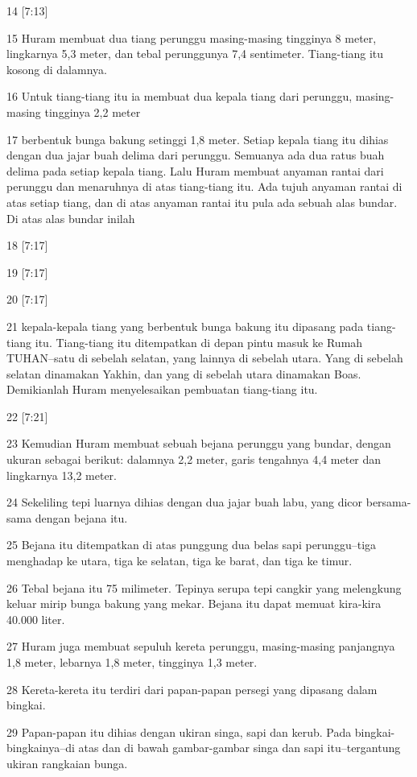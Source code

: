\par 14 [7:13]
\par 15 Huram membuat dua tiang perunggu masing-masing tingginya 8 meter, lingkarnya 5,3 meter, dan tebal perunggunya 7,4 sentimeter. Tiang-tiang itu kosong di dalamnya.
\par 16 Untuk tiang-tiang itu ia membuat dua kepala tiang dari perunggu, masing-masing tingginya 2,2 meter
\par 17 berbentuk bunga bakung setinggi 1,8 meter. Setiap kepala tiang itu dihias dengan dua jajar buah delima dari perunggu. Semuanya ada dua ratus buah delima pada setiap kepala tiang. Lalu Huram membuat anyaman rantai dari perunggu dan menaruhnya di atas tiang-tiang itu. Ada tujuh anyaman rantai di atas setiap tiang, dan di atas anyaman rantai itu pula ada sebuah alas bundar. Di atas alas bundar inilah
\par 18 [7:17]
\par 19 [7:17]
\par 20 [7:17]
\par 21 kepala-kepala tiang yang berbentuk bunga bakung itu dipasang pada tiang-tiang itu. Tiang-tiang itu ditempatkan di depan pintu masuk ke Rumah TUHAN--satu di sebelah selatan, yang lainnya di sebelah utara. Yang di sebelah selatan dinamakan Yakhin, dan yang di sebelah utara dinamakan Boas. Demikianlah Huram menyelesaikan pembuatan tiang-tiang itu.
\par 22 [7:21]
\par 23 Kemudian Huram membuat sebuah bejana perunggu yang bundar, dengan ukuran sebagai berikut: dalamnya 2,2 meter, garis tengahnya 4,4 meter dan lingkarnya 13,2 meter.
\par 24 Sekeliling tepi luarnya dihias dengan dua jajar buah labu, yang dicor bersama-sama dengan bejana itu.
\par 25 Bejana itu ditempatkan di atas punggung dua belas sapi perunggu--tiga menghadap ke utara, tiga ke selatan, tiga ke barat, dan tiga ke timur.
\par 26 Tebal bejana itu 75 milimeter. Tepinya serupa tepi cangkir yang melengkung keluar mirip bunga bakung yang mekar. Bejana itu dapat memuat kira-kira 40.000 liter.
\par 27 Huram juga membuat sepuluh kereta perunggu, masing-masing panjangnya 1,8 meter, lebarnya 1,8 meter, tingginya 1,3 meter.
\par 28 Kereta-kereta itu terdiri dari papan-papan persegi yang dipasang dalam bingkai.
\par 29 Papan-papan itu dihias dengan ukiran singa, sapi dan kerub. Pada bingkai-bingkainya--di atas dan di bawah gambar-gambar singa dan sapi itu--tergantung ukiran rangkaian bunga.
